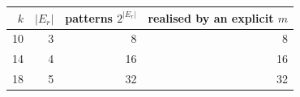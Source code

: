 \begin{tabular}{@{}rrrr@{}}\toprule
$k$ & $|E_r|$ & patterns $2^{|E_r|}$ & realised by an explicit $m$\\\midrule
10 & 3 & 8 & 8 \\
14 & 4 & 16 & 16 \\
18 & 5 & 32 & 32 \\
\bottomrule\end{tabular}
